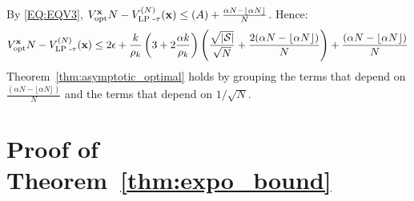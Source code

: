 {\begin{align*}
\end{align*}
By \eqref{EQ:EQV3}, $V_{\text{opt}}^{\textbf{x}}{N} - V_{\text{LP -} \tau}^{(N)}(\textbf{x}) \le (A) + \frac{\alpha N - \lfloor\alpha N\rfloor}{N}$. Hence: 
\begin{equation*}
   V_{\text{opt}}^{\textbf{x}}{N} - V_{\text{LP -} \tau}^{(N)}(\textbf{x}) \leq  2\epsilon + \frac{k}{\rho_{k}}\left(3 + 2\frac{\alpha k}{\rho_{k}} \right)\left(\frac{\sqrt{|\mathcal{S}|}}{\sqrt{N}} + \frac{2(\alpha N - \lfloor{\alpha N}\rfloor)}{N}\right) + \frac{(\alpha N - \lfloor{\alpha N}\rfloor)}{N}
\end{equation*}
Theorem~\ref{thm:asymptotic_optimal} holds by grouping the terms that depend on $\frac{(\alpha N - \lfloor{\alpha N}\rfloor)}{N}$ and the terms that depend on $1/\sqrt{N}$.
}
\section{Proof of Theorem~\ref{thm:expo_bound}}
\label{apx:PFcomp_expo}

